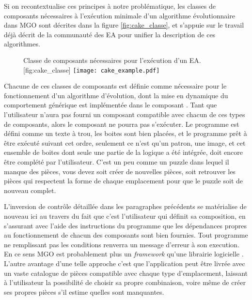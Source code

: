 Si on recontextualise ces principes à notre problématique, les classes de composants nécessaires à l'exécution minimale d'un algorithme évolutionnaire dans MGO sont décrites dans la figure \ref{fig:cake_classe}, et s'appuie sur le travail déjà décrit de la communauté des EA pour unifier la description de ces algorithmes.

\begin{figure}[!htbp]
	\begin{sidecaption}[fortoc]{Classe de composants nécessaires pour l'exécution d'un EA.}[fig:cake_classe]
		\centering
		\texttt{[image: cake\_example.pdf]}{
		}
  \end{sidecaption}
\end{figure}

Chacune de ces classes de composants est définie comme nécessaire pour le fonctionnement d'un algorithme d'évolution, dont la mise en dynamique du comportement générique est implémentée dans le composant . Tant que l'utilisateur n'aura pas fourni un composant compatible avec chacun de ces types de composants, alors le composant  ne pourra pas s'exécuter. Le programme est défini comme un texte à trou, les boites sont bien placées, et le programme prêt à être exécuté suivant cet ordre, seulement ce n'est qu'un patron, une image, et cet ensemble de boites dont seule une partie de la logique a été intégrée, doit encore être complété par l'utilisateur. C'est un peu comme un puzzle dans lequel il manque des pièces, vous devez soit créer de nouvelles pièces, soit retrouver les pièces qui respectent la forme de chaque emplacement pour que le puzzle soit de nouveau complet.

L'inversion de contrôle détaillée dans les paragraphes précédents se matérialise de nouveau ici au travers du fait que c'est l'utilisateur qui définit sa composition, en s'assurant avec l'aide des instructions du programme que les dépendances propres au fonctionnement de chacun des composants sont bien fournies. Tout programme ne remplissant pas les conditions renverra un message d'erreur à son execution. En ce sens MGO est probablement plus un \textit{framework} qu'une librairie logicielle . L'autre avantage d'une telle approche c'est que l'application peut être livrée avec un vaste catalogue de pièces compatible avec chaque type d'emplacement, laissant à l'utilisateur la possibilité de choisir sa propre combinaison, voire même de créer ses propres pièces s'il estime quelles sont manquantes.

